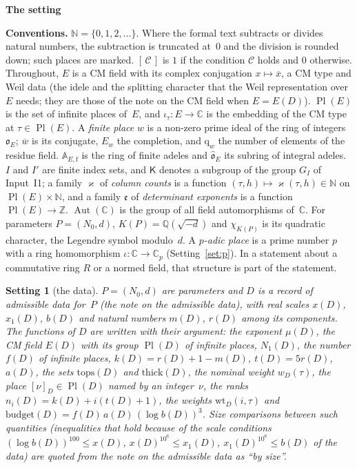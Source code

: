 \documentclass[11pt,a4paper]{article}
\newcommand{\Q}{\mathbb{Q}}
\newcommand{\Z}{\mathbb{Z}}
\newcommand{\sect}[2]{\refstepcounter{section}\label{#2}\par\addvspace{19pt plus 4pt minus 2pt}\Needspace{7\baselineskip}%
  \noindent\llap{{\fontsize{13.2}{16}\selectfont\bfseries\color{inkfaint}\thesection}\hspace{9pt}}%
  {\fontsize{13.2}{16}\selectfont\bfseries\color{ink}#1}\par\nopagebreak\vspace{-1pt}}
\theoremstyle{plainx}
\theoremstyle{uprightx}
\newtheorem{setting}[theorem]{Setting}          %
\newenvironment{conventions}{\par\addvspace{5pt}\noindent\textbf{Conventions.}\enspace\ignorespaces}{\par\addvspace{3pt}}
\newcommand{\CC}{\mathbb{C}}
\newcommand{\NN}{\mathbb{N}}
\newcommand{\OO}{\mathfrak{o}}
\newcommand{\Af}[1]{\mathbb{A}_{#1,\mathrm{f}}}
\newcommand{\cj}[1]{\overline{#1}}
\newcommand{\Aut}{\operatorname{Aut}(\CC)}
\newcommand{\KP}[1]{K(#1)}
\newcommand{\chiK}[1]{\chi_{\KP{#1}}}
\newcommand{\ED}[1]{E(#1)}
\newcommand{\Dmu}[1]{\mu(#1)}
\newcommand{\xD}[1]{x(#1)}
\newcommand{\xoD}[1]{x_1(#1)}
\newcommand{\bD}[1]{b(#1)}
\newcommand{\mD}[1]{m(#1)}
\newcommand{\rD}[1]{r(#1)}
\newcommand{\NnD}[1]{N_1(#1)}
\newcommand{\PlD}[1]{\operatorname{Pl}(#1)}
\newcommand{\fD}[1]{f(#1)}
\newcommand{\kD}[1]{k(#1)}
\newcommand{\tD}[1]{t(#1)}
\newcommand{\aD}[1]{a(#1)}
\newcommand{\tops}[1]{\mathrm{tops}(#1)}
\newcommand{\thick}[1]{\mathrm{thick}(#1)}
\newcommand{\nomW}[2]{w_{#1}(#2)}
\newcommand{\bud}[1]{\mathrm{budget}(#1)}
\newcommand{\pin}[2]{[#2]_{#1}}
\newcommand{\nD}[2]{n_{#2}(#1)}
\newcommand{\wtD}[3]{\mathrm{wt}_{#1}(#2,#3)}
\newcommand{\emb}[1]{\iota_{#1}}
\newcommand{\Gf}[1]{G_{#1}}
\begin{document}
\sect{The setting}{s:setting}
\begin{conventions}\label{c:conventions}
$\NN=\{0,1,2,\dots\}$. Where the formal text subtracts or divides natural numbers, the subtraction is truncated
at~$0$ and the division is rounded down; such places are marked. $[\,\mathcal{C}\,]$ is $1$ if the condition
$\mathcal{C}$ holds and $0$ otherwise. Throughout, $E$ is a CM field with its complex conjugation $x\mapsto\cj{x}$,
a CM type and Weil data (the idele and the splitting character that the Weil representation over $E$ needs; they
are those of the note on the CM field when $E=\ED{D}$). $\operatorname{Pl}(E)$ is the set of infinite places
of~$E$, and $\emb{\tau}\colon E\to\CC$ is the embedding of the CM type at $\tau\in\operatorname{Pl}(E)$. A
\emph{finite place} $w$ is a non-zero prime ideal of the ring of integers $\OO_E$; $\cj{w}$ is its conjugate,
$E_w$ the completion, and $\mathrm{q}_w$ the number of elements of the residue field. $\Af{E}$ is the ring of
finite adeles and $\widehat{\OO}_E$ its subring of integral adeles. $I$ and $I'$ are finite index sets, and $\mathsf{K}$ denotes a subgroup of the group $\Gf{I}$ of Input~I1; a
family $\varkappa$ of \emph{column counts} is a function $(\tau,h)\mapsto\varkappa(\tau,h)\in\NN$ on
$\operatorname{Pl}(E)\times\NN$, and a family $\mathfrak{e}$ of \emph{determinant exponents} is a function
$\operatorname{Pl}(E)\to\Z$. $\Aut$ is the group of all field automorphisms of~$\CC$. For parameters
$P=(N_0,d)$, $\KP{P}=\Q(\sqrt{-d})$ and $\chiK{P}$ is its quadratic character, the Legendre symbol modulo~$d$. A \emph{$p$-adic place} is a prime number $p$ with a ring homomorphism $\iota\colon\CC\to\CC_p$ (Setting~\ref{set:p}). In a
statement about a commutative ring $R$ or a normed field, that structure is part of the statement.
\end{conventions}

\begin{setting}[the data]\label{set:D}
$P=(N_0,d)$ are parameters and $D$ is a record of admissible data for~$P$ (the note on the admissible data), with
real scales $\xD{D}$, $\xoD{D}$, $\bD{D}$ and natural numbers $\mD{D}$, $\rD{D}$ among its components. The functions of $D$ are written
with their argument: the exponent $\Dmu{D}$, the CM field $\ED{D}$ with its group $\PlD{D}$ of infinite places,
$\NnD{D}$, the number $\fD{D}$ of infinite places, $\kD{D}=\rD{D}+1-\mD{D}$, $\tD{D}=5\rD{D}$, $\aD{D}$, the sets $\tops{D}$ and
$\thick{D}$, the nominal weight $\nomW{D}{\tau}$, the place $\pin{D}{\nu}\in\PlD{D}$ named by an integer~$\nu$,
the ranks $\nD{D}{i}=\kD{D}+i(\tD{D}+1)$, the weights $\wtD{D}{i}{\tau}$ and
$\bud{D}=\fD{D}\,\aD{D}\,(\log \bD{D})^3$. \emph{Size comparisons} between such quantities (inequalities that hold
because of the scale conditions $(\log \bD{D})^{100}\le \xD{D}$, $\xD{D}^{10^6}\le \xoD{D}$, $\xoD{D}^{10^6}\le \bD{D}$ of the data) are
quoted from the note on the admissible data as ``by size''.
\end{setting}
\end{document}

